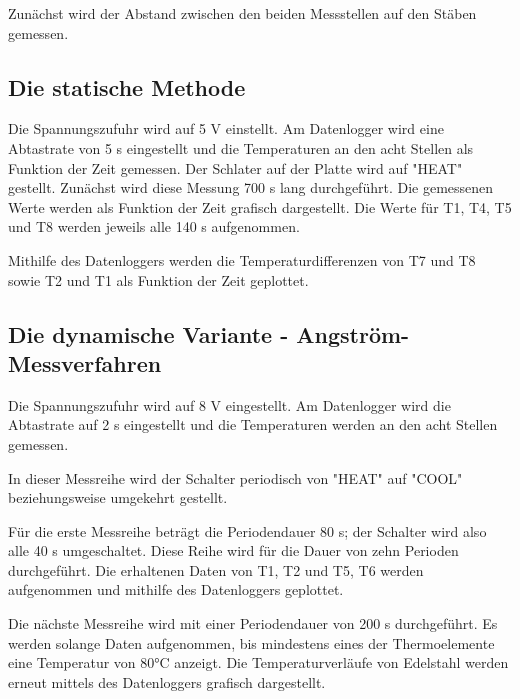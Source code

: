 Zunächst wird der Abstand zwischen den beiden Messstellen auf den Stäben gemessen.


\subsection{Die statische Methode}

Die Spannungszufuhr wird auf 5 V einstellt. Am Datenlogger wird eine Abtastrate von 5 s eingestellt und die Temperaturen an den acht Stellen als Funktion der Zeit gemessen.
Der Schlater auf der Platte wird auf "HEAT" gestellt.
Zunächst wird diese Messung 700 s lang durchgeführt.
Die gemessenen Werte werden als Funktion der Zeit grafisch dargestellt. Die Werte für T1, T4, T5 und T8 werden jeweils alle 140 s aufgenommen.

Mithilfe des Datenloggers werden die Temperaturdifferenzen von T7 und T8 sowie T2 und T1 als Funktion der Zeit geplottet.


\subsection{Die dynamische Variante - Angström-Messverfahren}

Die Spannungszufuhr wird auf 8 V eingestellt. Am Datenlogger wird die Abtastrate auf 2 s eingestellt und die Temperaturen werden an den acht Stellen gemessen.

In dieser Messreihe wird der Schalter periodisch von "HEAT" auf "COOL" beziehungsweise umgekehrt gestellt.

Für die  erste Messreihe beträgt die Periodendauer 80 s; der Schalter wird also alle 40 s umgeschaltet. Diese Reihe wird für die Dauer von zehn Perioden durchgeführt.
Die erhaltenen Daten von T1, T2 und T5, T6 werden aufgenommen und mithilfe des Datenloggers geplottet.

Die nächste Messreihe wird mit einer Periodendauer von 200 s durchgeführt. Es werden solange Daten aufgenommen, bis mindestens eines der Thermoelemente eine Temperatur von 80°C anzeigt. 
Die Temperaturverläufe von Edelstahl werden erneut mittels des Datenloggers grafisch dargestellt.